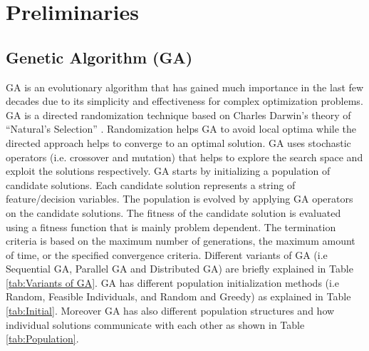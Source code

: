 \documentclass[preprint,12pt]{elsarticle}
\begin{document}
\section{Preliminaries} \label{sec:Prelim}

\subsection{Genetic Algorithm (GA)}
GA is an evolutionary algorithm that has gained much importance in the last few decades due to its simplicity and effectiveness for complex optimization problems. GA is a directed randomization technique based on Charles Darwin’s theory of “Natural’s Selection” \cite{chambers2019practical,mitchell1998introduction}. Randomization helps GA to avoid local optima while the directed approach helps to converge to an optimal solution. GA uses stochastic operators (i.e. crossover and mutation) that helps to explore the search space and exploit the solutions respectively. GA starts by initializing a population of candidate solutions. Each candidate solution represents a string of feature/decision variables. %
The population is evolved by applying GA operators on the candidate solutions. The fitness of the candidate solution is evaluated using a fitness function that is mainly problem dependent. The termination criteria is based on the maximum number of generations, the maximum amount of time, or the specified convergence criteria. Different variants of GA (i.e Sequential GA, Parallel GA and Distributed GA) are briefly explained in Table \ref{tab:Variants of GA}. GA has different population initialization methods (i.e Random, Feasible Individuals, and Random and Greedy) as explained in Table \ref{tab:Initial}. Moreover GA has also different population structures and how individual solutions communicate with each other as shown in Table \ref{tab:Population}. 
\end{document}
